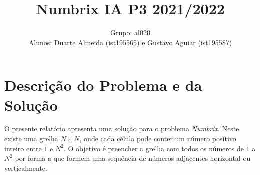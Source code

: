 \documentclass[12pt]{exam}
\author{Grupo: al020\\Alunos: Duarte Almeida (ist195565) e Gustavo Aguiar (ist195587)}
\title{Numbrix IA P3 2021/2022}
\date{}\date{}
\renewcommand\_{\textunderscore\linebreak[1]}
\begin{document}
    \maketitle
    \vspace{-6em}
    \section{Descrição do Problema e da Solução}
    \indent O presente relatório apresenta uma solução para o problema \textit{Numbrix}.
    Neste existe uma grelha \textbf{$N\times N$}, onde cada célula pode conter um número positivo inteiro entre $1$ e $N^2$.
    O objetivo é preencher a grelha com todos os números de $1$ a $N^2$ por forma a que formem uma sequência de números adjacentes horizontal ou verticalmente. \par
\end{document}
